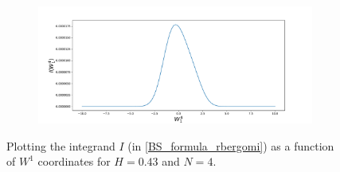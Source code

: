 \documentclass[11pt]{article}
\begin{document}
\begin{figure}[h!]
\begin{subfigure}[b]{0.475\textwidth}
		\caption{}
		\label{fig:sub4}
	\end{subfigure}
	\quad
	\begin{subfigure}[b]{0.475\textwidth}
		\centering
		\includegraphics[width=1\linewidth]{./figures/integrand_plotting_rBergomi/1D_plots/N_4/H_043/Bergomi_integrand_K_1_H_043_W14_N_4}
		\caption{}
		\label{fig:sub4}
	\end{subfigure}
	\caption{Plotting the integrand $I$ (in \eqref{BS_formula_rbergomi}) as a function of $W^1$ coordinates for $H=0.43$ and $N=4$.}
	\label{fig:Integrand_H_043_N_4_W_1_1}
\end{figure}
\end{document}
